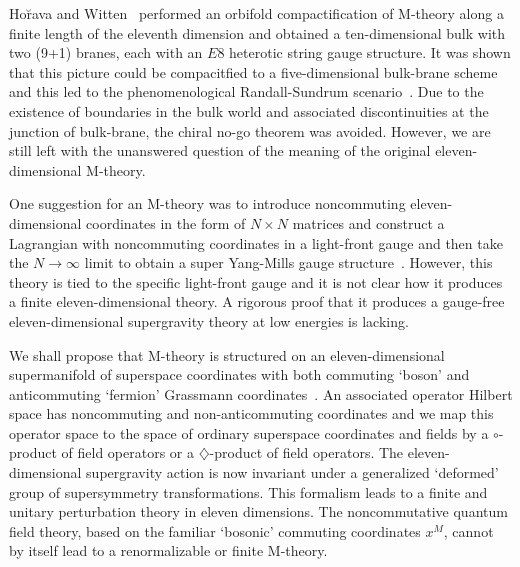 \documentclass[a4paper,12pt]{article}
\begin{document}
Ho\u{r}ava and Witten~\cite{Horava} performed an orbifold
compactification of M-theory along a finite length of the
eleventh dimension and obtained a ten-dimensional bulk with two
(9+1) branes, each with an $E8$ heterotic string gauge
structure. It was shown that this picture could be compacitfied
to a five-dimensional bulk-brane scheme and this led to the
phenomenological Randall-Sundrum scenario~\cite{Sundrum}. Due to
the existence of boundaries in the bulk world and associated
discontinuities at the junction of bulk-brane, the chiral no-go
theorem was avoided. However, we are still left with the
unanswered question of the meaning of the original
eleven-dimensional M-theory.

One suggestion for an
M-theory was to introduce noncommuting eleven-dimensional
coordinates in the form of $N\times N$ matrices and construct a
Lagrangian with noncommuting coordinates in a light-front gauge
and then take the $N\rightarrow\infty$ limit to obtain a super
Yang-Mills gauge structure~\cite{Susskind}. However, this theory is tied to the
specific light-front gauge and it is not clear how it produces a
finite eleven-dimensional theory. A rigorous proof that it
produces a gauge-free eleven-dimensional supergravity theory at
low energies is lacking.

We shall propose that M-theory is structured on an
eleven-dimensional supermanifold of superspace coordinates with
both commuting `boson' and anticommuting `fermion'
Grassmann
coordinates~\cite{Moffat2,Moffat3,Moffat4,Moffat5}.
An associated operator Hilbert space has noncommuting and
non-anticommuting coordinates and we map this operator space to
the space of ordinary superspace coordinates and fields by a
$\circ$-product of field operators or a $\diamondsuit$-product
of field operators. The eleven-dimensional supergravity action
is now invariant under a generalized `deformed' group of
supersymmetry transformations. This formalism leads to a finite
and unitary perturbation theory in eleven dimensions. The
noncommutative quantum field theory, based on the familiar
`bosonic' commuting coordinates $x^M$, cannot by itself lead to
a renormalizable or finite M-theory.
\end{document}
